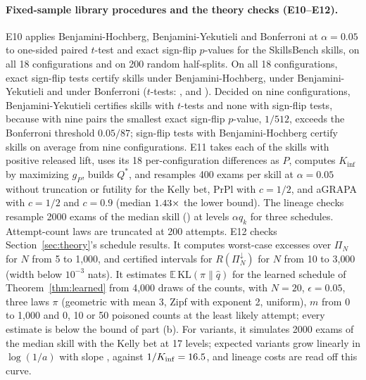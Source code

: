 \paragraph{Fixed-sample library procedures and the theory checks (E10--E12).} E10 applies Benjamini-Hochberg, Benjamini-Yekutieli and Bonferroni at $\alpha=0.05$ to one-sided paired $t$-test and exact sign-flip $p$-values for the \NSbTasks{} SkillsBench skills, on all 18 configurations and on 200 random half-splits. On all 18 configurations, exact sign-flip tests certify \NFnSfBH{} skills under Benjamini-Hochberg, \NFnSfBY{} under Benjamini-Yekutieli and \NFnSfBonf{} under Bonferroni ($t$-tests: \NFnTBH, \NFnTBY{} and \NFnTBonf). Decided on nine configurations, Benjamini-Yekutieli certifies \NFnSplitTBY{} skills with $t$-tests and none with sign-flip tests, because with nine pairs the smallest exact sign-flip $p$-value, $1/512$, exceeds the Bonferroni threshold $0.05/87$; sign-flip tests with Benjamini-Hochberg certify \NFnSplitSfBH{} skills on average from nine configurations. E11 takes each of the \NThHelpful{} skills with positive released lift, uses its 18 per-configuration differences as $P$, computes $K_{\inf}$ by maximizing $g_P$, builds $Q^*$, and resamples 400 exams per skill at $\alpha=0.05$ without truncation or futility for the Kelly bet, PrPl with $c=1/2$, and aGRAPA with $c=1/2$ and $c=0.9$ (median $1.43\times$ the lower bound). The lineage checks resample 2000 exams of the median skill (\NThMedTask) at levels $\alpha q_k$ for three schedules. Attempt-count laws are truncated at 200 attempts. E12 checks Section~\ref{sec:theory}'s schedule results. It computes worst-case excesses over $\Pi_N$ for $N$ from 5 to 1{,}000, and certified intervals for $R(\Pi_N^\downarrow)$ for $N$ from 10 to 3{,}000 (width below $10^{-3}$ nats). It estimates $\mathbb E\,\mathrm{KL}(\pi\|\hat q)$ for the learned schedule of Theorem~\ref{thm:learned} from 4{,}000 draws of the counts, with $N=20$, $\epsilon=0.05$, three laws $\pi$ (geometric with mean 3, Zipf with exponent 2, uniform), $m$ from 0 to 1{,}000 and 0, 10 or 50 poisoned counts at the least likely attempt; every estimate is below the bound of part (b). For variants, it simulates 2000 exams of the median skill with the Kelly bet at 17 levels; expected variants grow linearly in $\log(1/a)$ with slope \NScSlope, against $1/K_{\inf}=16.5$, and lineage costs are read off this curve.

